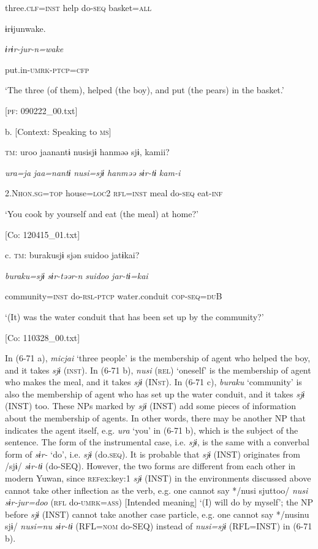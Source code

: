       three.\textsc{clf}=\textsc{inst}    help  do-\textsc{seq}  basket=\textsc{all}

      ɨrɨjunwake.

      \textit{ɨrɨr-jur-n=wake}

      put.in-\textsc{umrk}-\textsc{ptcp}=\textsc{cfp}

      ‘The three (of them), helped (the boy), and put (the pears) in the basket.’

      [\textsc{pf}: 090222\_00.txt]

  b.  [Context: Speaking to \textsc{ms}]

    \textsc{tm}:  uroo  jaanantɨ  nusisjɨ  hanməə  sjɨ,  kamii?

      \textit{ura=ja}  \textit{jaa=nantɨ}  \textit{nusi=sjɨ}  \textit{hanməə}  \textit{sɨr-tɨ}  \textit{kam-i}

      2.N\textsc{hon}.\textsc{sg}=\textsc{top}  house=\textsc{loc}2  \textsc{rfl}=\textsc{inst}  meal  do-\textsc{seq}  eat-\textsc{inf}

      ‘You cook by yourself and eat (the meal) at home?’

      [Co: 120415\_01.txt]

  c.  \textsc{tm}:  burakusjɨ  sjən  {\textbar}suidoo{\textbar}  jatɨkai?

      \textit{buraku=sjɨ}  \textit{sɨr-təər-n}  \textit{suidoo}  \textit{jar-tɨ=kai}

      community=\textsc{inst}  do-\textsc{rsl}-\textsc{ptcp}  water.conduit  \textsc{cop}-\textsc{seq}=\textsc{du}B

      ‘(It) was the water conduit that has been set up by the community?’

      [Co: 110328\_00.txt]

In (6-71 a), \textit{micjai} ‘three people’ is the membership of agent who helped the boy, and it takes \textit{sjɨ} (\textsc{inst}). In (6-71 b), \textit{nusi} (\textsc{rel}) ‘oneself’ is the membership of agent who makes the meal, and it takes \textit{sjɨ} (IN\textsc{st}). In (6-71 c), \textit{buraku} ‘community’ is also the membership of agent who has set up the water conduit, and it takes \textit{sjɨ} (INST) too. These NPs marked by \textit{sjɨ} (INST) add some pieces of information about the membership of agents. In other words, there may be another NP that indicates the agent itself, e.g. \textit{ura} ‘you’ in (6-71 b), which is the subject of the sentence. The form of the instrumental case, i.e. \textit{sjɨ}, is the same with a converbal form of \textit{sɨr-} ‘do’, i.e. \textit{sjɨ} (do.\textsc{seq}). It is probable that \textit{sjɨ} (INST) originates from /sjɨ/ \textit{sɨr-tɨ} (do-SEQ). However, the two forms are different from each other in modern Yuwan, since \textsc{ref}{ex:key:1} \textit{sjɨ} (INST) in the environments discussed above cannot take other inflection as the verb, e.g. one cannot say */nusi sjuttoo/ \textit{nusi} \textit{sɨr-jur=doo} (\textsc{rfl} do-\textsc{umrk}=\textsc{ass}) [Intended meaning] ‘(I) will do by myself’;  the NP before \textit{sjɨ} (INST) cannot take another case particle, e.g. one cannot say */nusinu sjɨ/ \textit{nusi=nu} \textit{sɨr-tɨ} (RFL=\textsc{nom} do-SEQ) instead of \textit{nusi=sjɨ} (RFL=INST) in (6-71 b).

